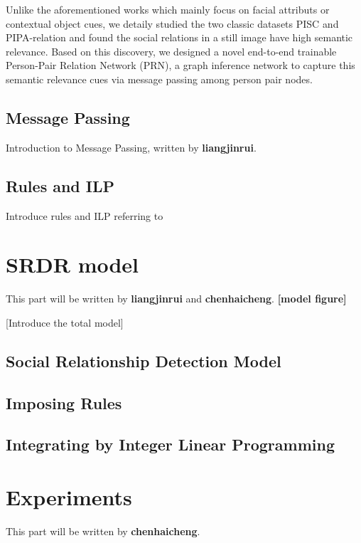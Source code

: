 \documentclass{article}
\begin{document}
Unlike the aforementioned works which mainly focus on facial attributs or contextual object cues, we detaily studied the two classic datasets PISC \cite{DBLP:conf/iccv/LiWZK17} and PIPA-relation \cite{DBLP:conf/cvpr/SunSF17} and found the social relations in a still image have high semantic relevance. Based on this discovery, we designed a novel end-to-end trainable Person-Pair Relation Network (PRN), a graph inference network to capture this semantic relevance cues via message passing among person pair nodes.

\subsection{Message Passing}%


Introduction to Message Passing, written by {\bf liangjinrui}.
 


\subsection{Rules and ILP}

Introduce rules and ILP referring to \cite{DBLP:conf/ijcai/WangWG15}



\section{SRDR model}
This part will be written by {\bf liangjinrui} and {\bf chenhaicheng}.
{\bf [model figure]}

[Introduce the total model]

\subsection{Social Relationship Detection Model}
\subsection{Imposing Rules}
\subsection{Integrating by Integer Linear Programming}


\section{Experiments}

This part will be written by {\bf chenhaicheng}.
\end{document}
